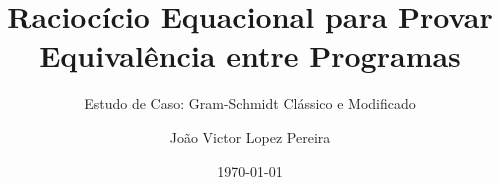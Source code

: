 




\title{Raciocício Equacional para Provar Equivalência entre Programas}
\subtitle{Estudo de Caso: Gram-Schmidt Clássico e Modificado}
\author{João Victor Lopez Pereira}
\date{\today}
